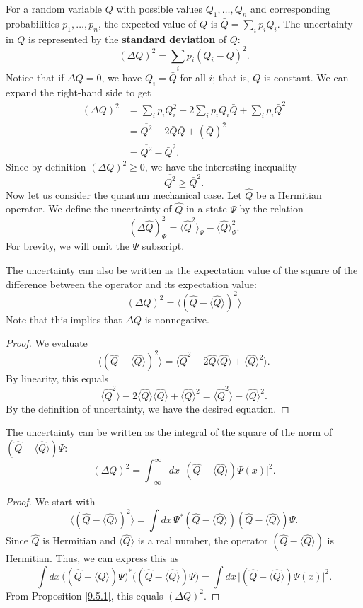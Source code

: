 For a random variable $Q$ with possible values $Q_1,\ldots,Q_n$ and corresponding probabilities $p_1,\ldots,p_n$, the expected value of $Q$ is $\bar{Q}=\sum_i p_iQ_i$. The uncertainty in $Q$ is represented by the \textbf{standard deviation} of $Q$: $$(\Delta Q)^2 = \sum_ip_i(Q_i-\bar{Q})^2.$$Notice that if $\Delta Q=0$, we have $Q_i=\bar{Q}$ for all $i$; that is, $Q$ is constant. We can expand the right-hand side to get \begin{align*}(\Delta Q)^2&=\sum_ip_iQ_i^2-2\sum_ip_iQ_i\bar{Q}+\sum_ip_i\bar{Q}^2\\&=\overline{Q^2}-2\bar{Q}\bar{Q}+(\bar{Q})^2\\&=\overline{Q^2}-\bar{Q}^2.\end{align*}Since by definition $(\Delta Q)^2\geq 0$, we have the interesting inequality $$\overline{Q^2}\geq \bar{Q}^2.$$Now let us consider the quantum mechanical case. Let $\hat{Q}$ be a Hermitian operator. We define the uncertainty of $\hat{Q}$ in a state $\Psi$ by the relation $$(\Delta\hat{Q})^2_\Psi=\langle\hat{Q}^2\rangle_\Psi-\langle\hat{Q}\rangle^2_\Psi.$$For brevity, we will omit the $\Psi$ subscript.

\begin{framedprop}
    \label{9.5.1}
    The uncertainty can also be written as the expectation value of the square of the difference between the operator and its expectation value: $$(\Delta Q)^2=\langle(\hat{Q}-\langle\hat{Q}\rangle)^2\rangle$$Note that this implies that $\Delta Q$ is nonnegative.

    \begin{proof}
    We evaluate $$\langle(\hat{Q}-\langle\hat{Q}\rangle)^2\rangle=\langle\hat{Q}^2-2\hat{Q}\langle\hat{Q}\rangle+\langle\hat{Q}\rangle^2\rangle.$$By linearity, this equals $$\langle\hat{Q}^2\rangle-2\langle\hat{Q}\rangle\langle\hat{Q}\rangle+\langle\hat{Q}\rangle^2=\langle\hat{Q}^2\rangle-\langle\hat{Q}\rangle^2.$$By the definition of uncertainty, we have the desired equation.
\end{proof}
\end{framedprop}

\begin{framedprop}\label{9.5.2}
    The uncertainty can be written as the integral of the square of the norm of $(\hat{Q}-\langle\hat{Q}\rangle)\Psi$:$$(\Delta Q)^2=\int_{-\infty}^{\infty}dx\,\bigg|(\hat{Q}-\langle\hat{Q}\rangle)\Psi(x)\bigg|^2.$$

    \begin{proof} We start with $$\langle(\hat{Q}-\langle\hat{Q}\rangle)^2\rangle=\int dx\,\Psi^*(\hat{Q}-\langle\hat{Q}\rangle)(\hat{Q}-\langle\hat{Q}\rangle)\Psi.$$Since $\hat{Q}$ is Hermitian and $\langle\hat{Q}\rangle$ is a real number, the operator $(\hat{Q}-\langle\hat{Q}\rangle)$ is Hermitian. Thus, we can express this as $$\int dx\,\bigg((\hat{Q}-\langle\hat{Q}\rangle)\Psi\bigg)^*\bigg((\hat{Q}-\langle\hat{Q}\rangle)\Psi\bigg)=\int dx\,\bigg|(\hat{Q}-\langle\hat{Q}\rangle)\Psi(x)\bigg|^2.$$From Proposition \ref{9.5.1}, this equals $(\Delta Q)^2$. \end{proof}
\end{framedprop}

